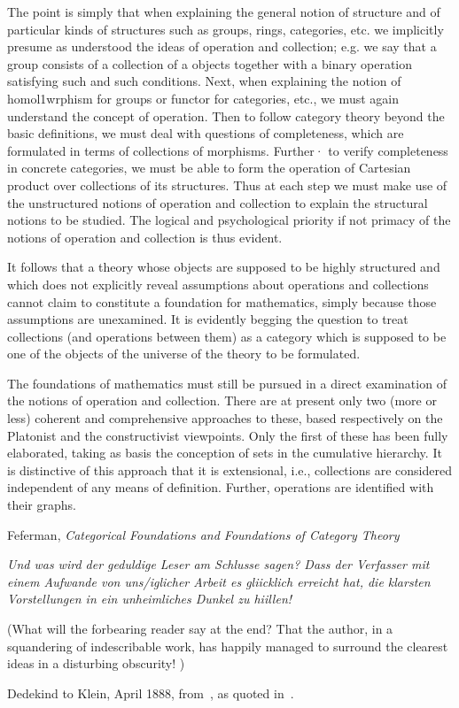 \documentclass[11pt,openany]{article}
\begin{document}
\epigraph{The point is simply that when explaining the general notion of
structure and of particular kinds of structures such as groups, rings,
categories, etc. we implicitly presume as understood the ideas of
operation and collection; e.g. we say that a group consists of a collection
of a objects together with a binary operation satisfying such and
such conditions. Next, when explaining the notion of homol1wrphism
for groups or functor for categories, etc., we must again understand the
concept of operation. Then to follow category theory beyond the basic
definitions, we must deal with questions of completeness, which are
formulated in terms of collections of morphisms. Further· to verify
completeness in concrete categories, we must be able to form the
operation of Cartesian product over collections of its structures. Thus
at each step we must make use of the unstructured notions of operation
and collection to explain the structural notions to be studied. The
logical and psychological priority if not primacy of the notions of
operation and collection is thus evident.
\par
It follows that a theory whose objects are supposed to be highly
structured and which does not explicitly reveal assumptions about
operations and collections cannot claim to constitute a foundation for
mathematics, simply because those assumptions are unexamined. It is
evidently begging the question to treat collections (and operations
between them) as a category which is supposed to be one of the objects
of the universe of the theory to be formulated.
\par
The foundations of mathematics must still be pursued in a direct
examination of the notions of operation and collection. There are at
present only two (more or less) coherent and comprehensive approaches
to these, based respectively on the Platonist and the constructivist
viewpoints. Only the first of these has been fully elaborated,
taking as basis the conception of sets in the cumulative hierarchy. It is
distinctive of this approach that it is extensional, i.e., collections are
considered independent of any means of definition. Further, operations
are identified with their graphs.}
{Feferman,
\textit{Categorical Foundations and Foundations of Category 
Theory}~\cite{feferman1977Categorical}}

\label{sec:Complexity}

\epigraph{
\textsl{Und was wird der geduldige Leser am
Schlusse sagen? Dass der Verfasser mit einem Aufwande von uns/iglicher Arbeit es gliicklich
erreicht hat, die klarsten Vorstellungen in ein unheimliches Dunkel zu hiillen!}
\par
(What will the forbearing reader say at the end? That the author, in a squandering of indescribable
work, has happily managed to surround the clearest ideas in a disturbing obscurity!
)}%
{Dedekind to Klein, April 1888, 
from~\cite{dugac1976DedekindFondements},
as quoted in~\cite{ferreiros2007labyrinth}.}
\end{document}
